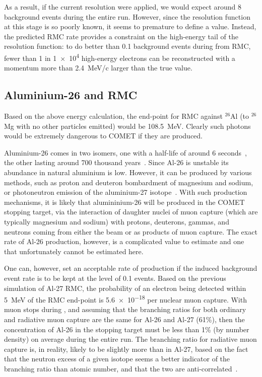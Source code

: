 As a result, if the current \phaseI resolution were applied, we would expect around 8 background events during the entire run.
However, since the resolution function at this stage is so poorly known, it seems to premature to define a value.
Instead, the predicted RMC rate provides a constraint on the high-energy tail of the resolution function: to do better than 0.1 background events during \phaseII from RMC, fewer than 1 in \num{1e4} high-energy electrons can be reconstructed with a momentum more than 2.4~MeV/c larger than the true value.

\subsection{Aluminium-26 and \acs{RMC}}
Based on the above energy calculation, the end-point for \ac{RMC} against ${}^{26}$Al (to ${}^{26}$Mg with no other particles emitted) would be 108.5~MeV.
Clearly such photons would be extremely dangerous to COMET if they are produced.

Aluminium-26 comes in two isomers, one with a half-life of around 6 seconds~\cite{PhysRevLett.106.032501}, the other lasting around 700 thousand years~\cite{AUDI20033}.
Since Al-26 is unstable its abundance in natural aluminium is low.
However, it can be produced by various methods, such as proton and deuteron bombardment of magnesium and sodium, or photoneutron emission of the aluminium-27 isotope~\cite{THOMPSON1965486}.
With such production mechanisms, it is likely that alumininium-26 will be produced in the COMET stopping target, via the interaction of daughter nuclei of muon capture (which are typically magnesium and sodium)
with protons, deuterons, gammas, and neutrons coming from either the beam or as products of muon capture.
The exact rate of Al-26 production, however, is a complicated value to estimate and one that unfortunately cannot be estimated here.

One can, however, set an acceptable rate of production if the induced background event rate is to be kept at the level of 0.1 events.
Based on the previous simulation of Al-27 \ac{RMC}, the probability of an electron being detected within 5~MeV of the \ac{RMC} end-point is \num{5.6e-18} per nuclear muon capture.
With \VarTotalMuStops muon stops during \phaseII, and assuming that the branching ratios for both ordinary and radiative muon capture are the same for Al-26 and Al-27 (61\%), then the
concentration of Al-26 in the stopping target must be less than 1\% (by number density) on average during the entire \phaseII run.
The branching ratio for radiative muon capture is, in reality, likely to be slightly more than in Al-27, based on the fact that the neutron excess of a given isotope seems a better indicator of the branching ratio than atomic number, and that the two are anti-correlated~\cite{RevModPhys.76.31}.


